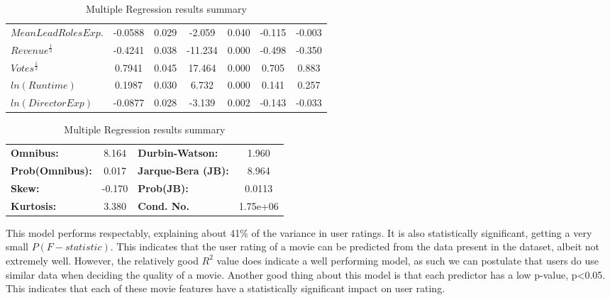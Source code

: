 \begin{table}[H]
\begin{center}
\begin{tabular}{lcccccc}
                \textbf{$Mean Lead Roles Exp.$}  &      -0.0588  &        0.029     &    -2.059  &         0.040        &       -0.115    &       -0.003     \\
                \textbf{$Revenue^{\frac{1}{3}}$} &      -0.4241  &        0.038     &   -11.234  &         0.000        &       -0.498    &       -0.350     \\
                \textbf{$Votes^{\frac{1}{3}}$}   &       0.7941  &        0.045     &    17.464  &         0.000        &        0.705    &        0.883     \\
                \textbf{$ln(Runtime)$}           &       0.1987  &        0.030     &     6.732  &         0.000        &        0.141    &        0.257     \\
                \textbf{$ln(Director Exp)$}      &      -0.0877  &        0.028     &    -3.139  &         0.002        &       -0.143    &       -0.033     \\
                \bottomrule
            \end{tabular}
            \begin{tabular}{lclc}
                \textbf{Omnibus:}       &  8.164 & \textbf{  Durbin-Watson:     } &    1.960  \\
                \textbf{Prob(Omnibus):} &  0.017 & \textbf{  Jarque-Bera (JB):  } &    8.964  \\
                \textbf{Skew:}          & -0.170 & \textbf{  Prob(JB):          } &   0.0113  \\
                \textbf{Kurtosis:}      &  3.380 & \textbf{  Cond. No.          } & 1.75e+06  \\
                \bottomrule
            \end{tabular}
        \end{center}
        \caption[short]{Multiple Regression results summary}\label{tab:rating-osm-summary}
    \end{table}
    This model performs respectably, explaining about  41\% of the variance in user ratings.
    It is also statistically significant, getting a very small  $P(F-statistic)$.
    This indicates that the user rating of a movie can be predicted from the data present in the dataset,
        albeit not extremely well.
    However, the relatively good $R^2$ value does indicate a well performing model, as such
        we can postulate that users do use similar data when deciding the quality of a movie.
    Another good thing about this model is that each predictor has a low p-value, p<0.05.
    This indicates that each of these movie features have a statistically significant impact
        on user rating.

    
